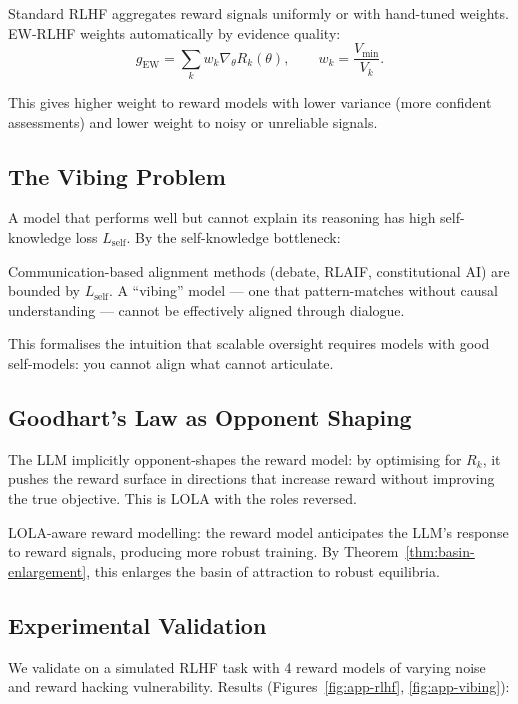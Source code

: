 Standard RLHF aggregates reward signals uniformly or with hand-tuned weights. EW-RLHF weights automatically by evidence quality:
\begin{equation}
    g_{\text{EW}} = \sum_k w_k \nabla_\theta R_k(\theta), \qquad
    w_k = \frac{V_{\min}}{V_k}.
\end{equation}

This gives higher weight to reward models with lower variance (more confident assessments) and lower weight to noisy or unreliable signals.

\subsection{The Vibing Problem}

A model that performs well but cannot explain its reasoning has high self-knowledge loss $L_{\text{self}}$. By the self-knowledge bottleneck:

\begin{corollary}
Communication-based alignment methods (debate, RLAIF, constitutional AI) are bounded by $L_{\text{self}}$. A ``vibing'' model --- one that pattern-matches without causal understanding --- cannot be effectively aligned through dialogue.
\end{corollary}

This formalises the intuition that scalable oversight requires models with good self-models: you cannot align what cannot articulate.

\subsection{Goodhart's Law as Opponent Shaping}

The LLM implicitly opponent-shapes the reward model: by optimising for $R_k$, it pushes the reward surface in directions that increase reward without improving the true objective. This is LOLA with the roles reversed.

LOLA-aware reward modelling: the reward model anticipates the LLM's response to reward signals, producing more robust training. By Theorem~\ref{thm:basin-enlargement}, this enlarges the basin of attraction to robust equilibria.

\subsection{Experimental Validation}

We validate on a simulated RLHF task with 4 reward models of varying noise and reward hacking vulnerability. Results (Figures~\ref{fig:app-rlhf}, \ref{fig:app-vibing}):

